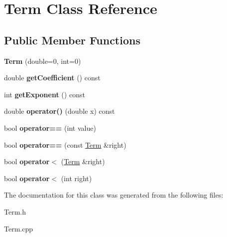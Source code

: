 \hypertarget{classTerm}{\section{Term Class Reference}
\label{classTerm}
}
\subsection*{Public Member Functions}
\begin{DoxyCompactItemize}
\item 
\hypertarget{classTerm_aa72ef129269040b50836346dcae32154}{{\bfseries Term} (double=0, int=0)}\label{classTerm_aa72ef129269040b50836346dcae32154}

\item 
\hypertarget{classTerm_a155053b3506f434c6c788deb46b58eca}{double {\bfseries get\-Coefficient} () const }\label{classTerm_a155053b3506f434c6c788deb46b58eca}

\item 
\hypertarget{classTerm_a4366a4bde58427fde228da9f95505a78}{int {\bfseries get\-Exponent} () const }\label{classTerm_a4366a4bde58427fde228da9f95505a78}

\item 
\hypertarget{classTerm_ab89ea23f82711d4fc9f4608d0937ce31}{double {\bfseries operator()} (double x) const }\label{classTerm_ab89ea23f82711d4fc9f4608d0937ce31}

\item 
\hypertarget{classTerm_a8e563a63ca972c9d2cffacb471a611a5}{bool {\bfseries operator==} (int value)}\label{classTerm_a8e563a63ca972c9d2cffacb471a611a5}

\item 
\hypertarget{classTerm_a22d1367b67d2c2d2762392463decde13}{bool {\bfseries operator==} (const \hyperlink{classTerm}{Term} \&right)}\label{classTerm_a22d1367b67d2c2d2762392463decde13}

\item 
\hypertarget{classTerm_ade58cd311d21215402183d2dec66b48a}{bool {\bfseries operator$<$} (\hyperlink{classTerm}{Term} \&right)}\label{classTerm_ade58cd311d21215402183d2dec66b48a}

\item 
\hypertarget{classTerm_a44f5d686c50172e689cf86b2c77bbc6a}{bool {\bfseries operator$<$} (int right)}\label{classTerm_a44f5d686c50172e689cf86b2c77bbc6a}

\end{DoxyCompactItemize}


The documentation for this class was generated from the following files\-:\begin{DoxyCompactItemize}
\item 
Term.\-h\item 
Term.\-cpp\end{DoxyCompactItemize}
